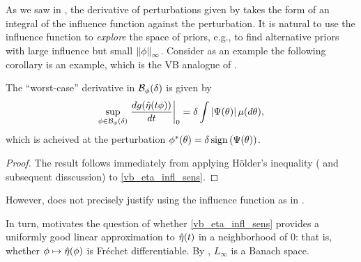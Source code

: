 As we saw in , the derivative of perturbations given
by  takes the form of an integral of the influence
function against the perturbation.  It is natural to use the influence function
to {\em explore} the space of priors, e.g., to find alternative priors with
large influence but small $\left\Vert\phi\right\Vert_{\infty}$.  Consider as an example the
following corollary is an example, which is the VB analogue of \citet[Result
11]{gustafson:1996:local}.



\begin{cor}
%
The ``worst-case'' derivative in $\mathcal{B}_\phi(\delta)$ is given by
%
\begin{align*}
%
\sup_{\phi \in \ball_\phi(\delta)}
    \fracat{d g(\etaopt(\t \phi))}{d \t}{0} =
        \delta \int \abs{\infl(\theta)} \mu(d\theta),
%
\end{align*}
%
which is acheived at the perturbation
$\phi^*(\theta) = \delta \, \mathrm{sign}\left(\Psi(\theta)\right)$.
%
\begin{proof}
%
The result follows immediately from applying H{\"o}lder's inequality
(\citet[Theorem 5.1.2]{dudley:2018:real} and subsequent disscussion)
to \eqref{vb_eta_infl_sens}.
%
\end{proof}
%
\end{cor}


However,  does not precisely justify using
the influence function as in .


In turn,  motivates the question of whether
\eqref{vb_eta_infl_sens} provides a uniformly good linear approximation to
$\hat\eta(t)$ in a neighborhood of $0$: that is, whether $\phi \mapsto
\hat\eta(\phi)$ is Fr{\'e}chet differentiable. By \citep[Theorem
5.2.1]{dudley:2018:real}, $L_\infty$ is a Banach space.

